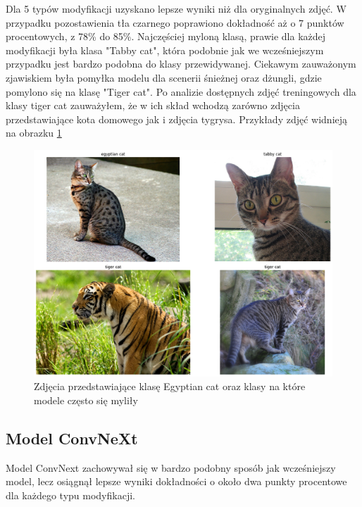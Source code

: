 Dla 5 typów modyfikacji uzyskano lepsze wyniki niż dla oryginalnych zdjęć. W przypadku pozostawienia tła czarnego poprawiono dokładność aż o 7 punktów procentowych, z 78\% do 85\%. Najczęściej myloną klasą, prawie dla każdej modyfikacji była klasa "Tabby cat", która podobnie jak
we wcześniejszym przypadku jest bardzo podobna do klasy przewidywanej. Ciekawym zauważonym zjawiskiem była pomyłka modelu dla scenerii śnieżnej oraz dżungli, gdzie pomylono się na klasę "Tiger cat". Po analizie dostępnych zdjęć treningowych dla klasy tiger cat zauważyłem, że w ich skład 
wchodzą zarówno zdjęcia przedstawiające kota domowego jak i zdjęcia tygrysa. Przykłady zdjęć widnieją na obrazku \ref*{rys:285}

\begin{figure}
	\centering\includegraphics[width=.9\textwidth]{img/285}
	\caption{Zdjęcia przedstawiające klasę Egyptian cat oraz klasy na które modele często się myliły}
	\label{rys:285}
\end{figure}

\subsection*{Model ConvNeXt}

Model ConvNext zachowywał się w bardzo podobny sposób jak wcześniejszy model, lecz osiągnął lepsze wyniki dokładności o około dwa punkty procentowe dla każdego typu modyfikacji.


